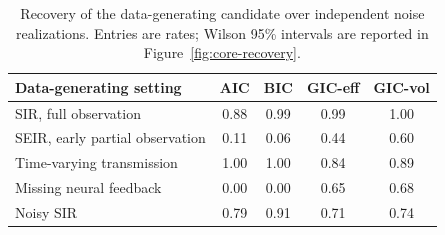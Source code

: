 \begin{table}[t]
\caption{Recovery of the data-generating candidate over independent noise realizations. Entries are rates; Wilson 95\% intervals are reported in Figure~\ref{fig:core-recovery}.}
\label{tab:core-recovery}
\centering
\begin{tabular}{lcccc}
\toprule
Data-generating setting & AIC & BIC & GIC-eff & GIC-vol\\
\midrule
SIR, full observation & 0.88 & 0.99 & 0.99 & 1.00\\
SEIR, early partial observation & 0.11 & 0.06 & 0.44 & 0.60\\
Time-varying transmission & 1.00 & 1.00 & 0.84 & 0.89\\
Missing neural feedback & 0.00 & 0.00 & 0.65 & 0.68\\
Noisy SIR & 0.79 & 0.91 & 0.71 & 0.74\\
\bottomrule
\end{tabular}
\end{table}
